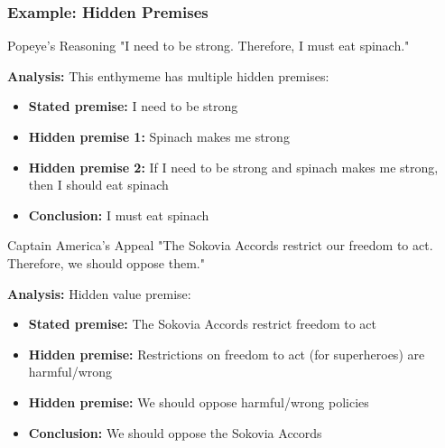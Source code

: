 \documentclass{beamer}
\begin{document}
\begin{frame}
    \frametitle{Example: Hidden Premises}
    
    \begin{exampleblock}{Popeye's Reasoning}
    \scriptsize
        "I need to be strong. Therefore, I must eat spinach."
        
        \textbf{Analysis:} This enthymeme has multiple hidden premises:
        \begin{itemize}
            \item \textbf{Stated premise:} I need to be strong
            \item \textbf{Hidden premise 1:} Spinach makes me strong
            \item \textbf{Hidden premise 2:} If I need to be strong and spinach makes me strong, then I should eat spinach
            \item \textbf{Conclusion:} I must eat spinach
        \end{itemize}
    \end{exampleblock}
    
    \begin{exampleblock}{Captain America's Appeal}
    \scriptsize
        "The Sokovia Accords restrict our freedom to act. Therefore, we should oppose them."
        
        \textbf{Analysis:} Hidden value premise:
        \begin{itemize}
            \item \textbf{Stated premise:} The Sokovia Accords restrict freedom to act
            \item \textbf{Hidden premise:} Restrictions on freedom to act (for superheroes) are harmful/wrong
            \item \textbf{Hidden premise:} We should oppose harmful/wrong policies
            \item \textbf{Conclusion:} We should oppose the Sokovia Accords
        \end{itemize}
    \end{exampleblock}
\end{frame}
\end{document}
